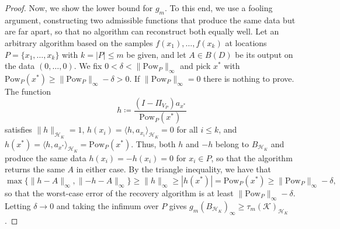 \documentclass[10pt,a4paper]{amsart}
\newcommand{\ip}[2]{\langle #1,#2\rangle}
\newcommand{\norm}[1]{\lVert #1\rVert}
\begin{document}
\begin{proof}
Now, we show the lower bound for $g_m$.
To this end, we use a fooling argument, constructing two admissible functions that produce the same data but are far apart, so that no algorithm can reconstruct both equally well.
Let an arbitrary algorithm based on the samples $f(x_1),\dots,f(x_k)$ at locations $P=\{x_1,\dots,x_k\}$ with $k=|P|\le m$ be given, and let $A\in B(D)$ be its output on the data $(0,\dots,0)$.
We fix $0<\delta<\norm{\mathrm{Pow}_P}_\infty$ and pick $x^*$ with $\mathrm{Pow}_P(x^*)\ge \norm{\mathrm{Pow}_P}_\infty-\delta>0$.
If $\norm{\mathrm{Pow}_P}_\infty=0$ there is nothing to prove.
The function
\begin{equation}
    h \coloneqq \frac{(I-\Pi_{V_P})a_{x^*}}{\mathrm{Pow}_P(x^*)}
\end{equation}
satisfies $\norm{h}_{\mathcal H_K}=1$, $h(x_i)=\ip{h}{a_{x_i}}_{\mathcal H_K}=0$ for all $i\le k$, and $h(x^*)=\ip{h}{a_{x^*}}_{\mathcal H_K}=\mathrm{Pow}_P(x^*)$.
Thus, both $h$ and $-h$ belong to $B_{\mathcal H_K}$ and produce the same data $h(x_i)=-h(x_i)=0$ for $x_i\in P$, so that the
algorithm returns the same $A$ in either case. By the triangle inequality, we have that
\begin{equation}
    \max\bigl\{\norm{h-A}_\infty, \norm{-h-A}_\infty\bigr\} \ge \norm{h}_\infty \ge |h(x^*)| = \mathrm{Pow}_P(x^*)\ge\norm{\mathrm{Pow}_P}_\infty-\delta,
\end{equation}
so that the worst-case error of the recovery algorithm is at least $\norm{\mathrm{Pow}_P}_\infty-\delta$.
Letting $\delta\to0$ and taking the infimum over $P$ gives $g_m(B_{\mathcal H_K})_\infty\ge\tau_m(\mathcal{K})_{\mathcal{H}_K}$.
\end{proof}
\end{document}
